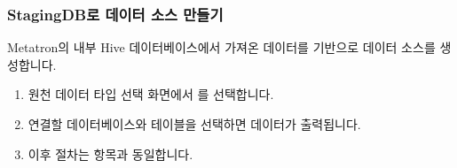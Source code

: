 \documentclass[letterpaper,10pt,english]{sphinxmanual}
\begin{document}
\subsubsection{StagingDB로 데이터 소스 만들기}
\label{\detokenize{discovery/part02/create_a_data_source:stagingdb}}\label{\detokenize{discovery/part02/create_a_data_source:create-datasource-from-stagingdb}}
Metatron의 내부 Hive 데이터베이스에서 가져온 데이터를 기반으로 데이터 소스를 생성합니다.
\begin{enumerate}
\def\theenumi{\arabic{enumi}}
\def\labelenumi{\theenumi .}
\makeatletter\def\p@enumii{\p@enumi \theenumi .}\makeatother
\item {} 
원천 데이터 타입 선택 화면에서 를 선택합니다.

\item {} 
연결할 데이터베이스와 테이블을 선택하면 데이터가 출력됩니다.
\begin{quote}

\begin{figure}[H]
\centering

\noindent{}
\end{figure}
\end{quote}

\item {} 
이후 절차는 {\hyperref[\detokenize{discovery/part02/create_a_data_source:create-datasource-from-db}]{}} 항목과 동일합니다.
\begin{quote}

\begin{figure}[H]
\centering

\noindent{}
\end{figure}
\end{quote}

\end{enumerate}
\end{document}
